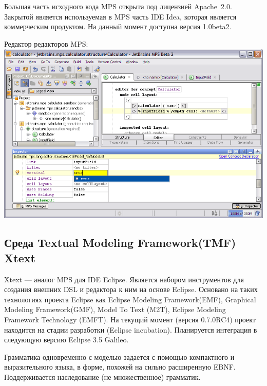 \documentclass[a4paper,12pt,titlepage]{extarticle}
\begin{document}
Большая часть исходного кода MPS открыта под лицензией Apache~2.0. Закрытой
является используемая в MPS часть IDE Idea, которая является коммерческим
продуктом.
На данный момент доступна версия 1.0beta2.

\begin{center}
Редактор редакторов MPS:\\
\includegraphics[scale=0.4]{img/mps.png}
\end{center}

\subsection{Среда Textual Modeling Framework(TMF) Xtext}
Xtext --- аналог MPS для IDE Eclipse. Является набором инструментов для
создания внешних DSL и редактора к ним на основе Eclipse. Основано на
таких технологиях проекта Eclipse как Eclipse Modeling Framework(EMF),
Graphical Modeling Framework(GMF), Model To Text (M2T), Eclipse Modeling
Framework Technology (EMFT). На текущий момент (версия 0.7.0RC4) проект
находится на стадии разработки (Eclipse incubation). Планируется интеграция в следующую
версию Eclipse 3.5 Galileo.

Грамматика одновременно с моделью задается с помощью компактного и
выразительного языка, в форме, похожей на сильно расширенную EBNF.
Поддерживается наследование (не множественное) грамматик.
\end{document}
